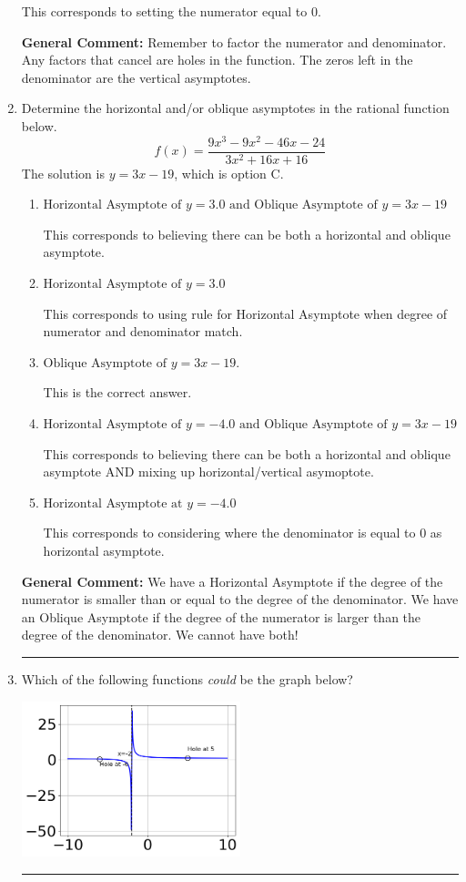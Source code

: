 \documentclass{extbook}[14pt]
\newcommand{\litem}[1]{\item #1

\rule{\textwidth}{0.4pt}}
\begin{document}
\begin{enumerate}
{\begin{enumerate}[label=\Alph*.]
This corresponds to setting the numerator equal to 0.
\end{enumerate}

\textbf{General Comment:} Remember to factor the numerator and denominator. Any factors that cancel are holes in the function. The zeros left in the denominator are the vertical asymptotes.
}
\litem{
Determine the horizontal and/or oblique asymptotes in the rational function below.
\[ f(x) = \frac{9x^{3} -9 x^{2} -46 x -24}{3x^{2} +16 x + 16} \]The solution is \( y = 3x -19 \), which is option C.\begin{enumerate}[label=\Alph*.]
\item \( \text{Horizontal Asymptote of } y = 3.0 \text{ and Oblique Asymptote of } y = 3x -19 \)

This corresponds to believing there can be both a horizontal and oblique asymptote.
\item \( \text{Horizontal Asymptote of } y = 3.0  \)

This corresponds to using rule for Horizontal Asymptote when degree of numerator and denominator match.
\item \( \text{Oblique Asymptote of } y = 3x -19. \)

This is the correct answer.
\item \( \text{Horizontal Asymptote of } y = -4.0 \text{ and Oblique Asymptote of } y = 3x -19 \)

This corresponds to believing there can be both a horizontal and oblique asymptote AND mixing up horizontal/vertical asymoptote.
\item \( \text{Horizontal Asymptote at } y = -4.0 \)

This corresponds to considering where the denominator is equal to 0 as horizontal asymptote.
\end{enumerate}

\textbf{General Comment:} We have a Horizontal Asymptote if the degree of the numerator is smaller than or equal to the degree of the denominator. We have an Oblique Asymptote if the degree of the numerator is larger than the degree of the denominator. We cannot have both!
}
\litem{
Which of the following functions \textit{could} be the graph below?

\begin{center}
    \includegraphics[width=0.5\textwidth]{../Figures/identifyGraphOfRationalFunctionB.png}
\end{center}


}
\end{enumerate}
\end{document}
